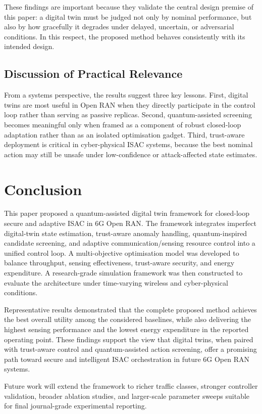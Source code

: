 \documentclass[10pt,journal]{IEEEtran}
\begin{document}
These findings are important because they validate the central design premise of this paper: a digital twin must be judged not only by nominal performance, but also by how gracefully it degrades under delayed, uncertain, or adversarial conditions. In this respect, the proposed method behaves consistently with its intended design.

\subsection{Discussion of Practical Relevance}
From a systems perspective, the results suggest three key lessons. First, digital twins are most useful in Open RAN when they directly participate in the control loop rather than serving as passive replicas. Second, quantum-assisted screening becomes meaningful only when framed as a component of robust closed-loop adaptation rather than as an isolated optimisation gadget. Third, trust-aware deployment is critical in cyber-physical ISAC systems, because the best nominal action may still be unsafe under low-confidence or attack-affected state estimates.

\section{Conclusion}
\label{sec:conclusion}
This paper proposed a quantum-assisted digital twin framework for closed-loop secure and adaptive ISAC in 6G Open RAN. The framework integrates imperfect digital-twin state estimation, trust-aware anomaly handling, quantum-inspired candidate screening, and adaptive communication/sensing resource control into a unified control loop. A multi-objective optimisation model was developed to balance throughput, sensing effectiveness, trust-aware security, and energy expenditure. A research-grade simulation framework was then constructed to evaluate the architecture under time-varying wireless and cyber-physical conditions.

Representative results demonstrated that the complete proposed method achieves the best overall utility among the considered baselines, while also delivering the highest sensing performance and the lowest energy expenditure in the reported operating point. These findings support the view that digital twins, when paired with trust-aware control and quantum-assisted action screening, offer a promising path toward secure and intelligent ISAC orchestration in future 6G Open RAN systems.

Future work will extend the framework to richer traffic classes, stronger controller validation, broader ablation studies, and larger-scale parameter sweeps suitable for final journal-grade experimental reporting.
\end{document}
